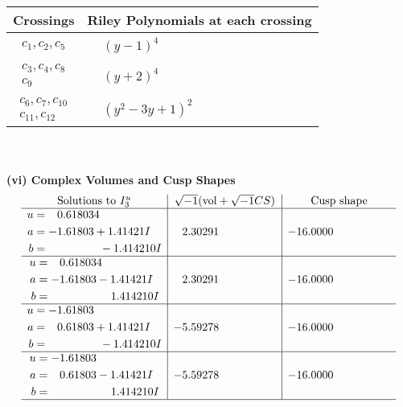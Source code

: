 \documentclass[1p]{elsarticle_modified}
\theoremstyle{definition}
\newcommand{\I}{\sqrt{-1}}
\begin{document}
\begin{tabular}{m{50pt}|m{274pt}}
Crossings & \hspace{64pt}Riley Polynomials at each crossing \\
\hline $$\begin{aligned}c_{1},c_{2},c_{5}\end{aligned}$$&$\begin{aligned}
&(y-1)^4
\end{aligned}$\\
\hline $$\begin{aligned}c_{3},c_{4},c_{8}\\c_{9}\end{aligned}$$&$\begin{aligned}
&(y+2)^4
\end{aligned}$\\
\hline $$\begin{aligned}c_{6},c_{7},c_{10}\\c_{11},c_{12}\end{aligned}$$&$\begin{aligned}
&(y^2-3 y+1)^2
\end{aligned}$\\
\hline
\end{tabular}\\~\\
\newpage\flushleft \textbf{(vi) Complex Volumes and Cusp Shapes}
$$\begin{array}{c|c|c}  
\text{Solutions to }I^u_{3}& \I (\text{vol} + \sqrt{-1}CS) & \text{Cusp shape}\\
 \hline 
\begin{aligned}
u &= \phantom{-}0.618034\phantom{ +0.000000I} \\
a &= -1.61803 + 1.41421 I \\
b &= \phantom{-0.000000 } -1.414210 I\end{aligned}
 & \phantom{-}2.30291\phantom{ +0.000000I} & -16.0000\phantom{ +0.000000I} \\ \hline\begin{aligned}
u &= \phantom{-}0.618034\phantom{ +0.000000I} \\
a &= -1.61803 - 1.41421 I \\
b &= \phantom{-0.000000 -}1.414210 I\end{aligned}
 & \phantom{-}2.30291\phantom{ +0.000000I} & -16.0000\phantom{ +0.000000I} \\ \hline\begin{aligned}
u &= -1.61803\phantom{ +0.000000I} \\
a &= \phantom{-}0.61803 + 1.41421 I \\
b &= \phantom{-0.000000 } -1.414210 I\end{aligned}
 & -5.59278\phantom{ +0.000000I} & -16.0000\phantom{ +0.000000I} \\ \hline\begin{aligned}
u &= -1.61803\phantom{ +0.000000I} \\
a &= \phantom{-}0.61803 - 1.41421 I \\
b &= \phantom{-0.000000 -}1.414210 I\end{aligned}
 & -5.59278\phantom{ +0.000000I} & -16.0000\phantom{ +0.000000I}\\
 \hline 
 \end{array}$$\newpage
\end{document}
